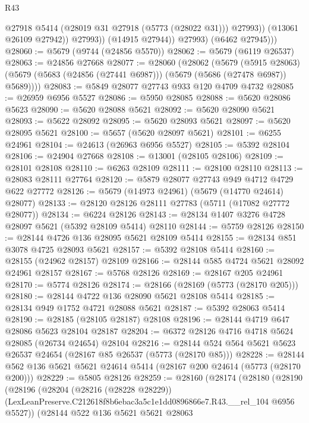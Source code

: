 \begin{lexlean}{R43}
\begin{coremodule}
                      @27918
                      @5414
                      (@28019 @31 @27918 (@5773 (@28022 @31)))
                      @27993))
                  (@13061 @26109 @27942))
                @27993))
            (@14915 @27944))
          @27993)
        (@6462 @27945)))
@28060 := @5679 (@9744 (@24856 @5570))
@28062 := @5679 (@6119 @26537)
@28063 := @24856 @27668
@28077 := @28060
    (@28062
      (@5679
        (@5915 @28063)
        (@5679 (@5683 (@24856 (@27441 @6987))) (@5679 (@5686 (@27478 @6987)) @5689))))
@28083 := @5849 @28077 @27743 @933 @120 @4709 @4732
@28085 := @26959 @6956 @5527
@28086 := @5950 @28085
@28088 := @5620 @28086 @5623
@28090 := @5620 @28088 @5621
@28092 := @5620 @28090 @5621
@28093 := @5622 @28092
@28095 := @5620 @28093 @5621
@28097 := @5620 @28095 @5621
@28100 := @5657 (@5620 @28097 @5621)
@28101 := @6255 @24961
@28104 := @24613 (@26963 @6956 @5527)
@28105 := @5392 @28104
@28106 := @24904 @27668
@28108 := @13001 (@28105 @28106)
@28109 := @28101 @28108
@28110 := @6263 @28109
@28111 := @28100 @28110
@28113 := @28083 @28111 @27764
@28120 := @5879 @28077 @27743 @949 @4712 @4729 @622 @27772
@28126 := @5679 (@14973 @24961) (@5679 (@14770 @24614) @28077)
@28133 := @28120 @28126 @28111 @27783 (@5711 (@17082 @27772 @28077))
@28134 := @6224 @28126
@28143 := @28134 @1407 @3276 @4728 @28097 @5621 (@5392 @28109 @5414) @28110
@28144 := @5759 @28126
@28150 := @28144 @4726 @136 @28095 @5621 @28109 @5414
@28155 := @28134 @851 @3078 @4725 @28093 @5621
@28157 := @5392 @28108 @5414
@28160 := @28155 (@24962 @28157) @28109
@28166 := @28144 @585 @4724 @5621 @28092 @24961 @28157
@28167 := @5768 @28126
@28169 := @28167 @205 @24961
@28170 := @5774 @28126
@28174 := @28166 (@28169 (@5773 (@28170 @205)))
@28180 := @28144 @4722 @136 @28090 @5621 @28108 @5414
@28185 := @28134 @949 @1752 @4721 @28088 @5621
@28187 := @5392 @28063 @5414
@28190 := @28185 (@28105 @28187) @28108
@28196 := @28144 @4719 @647 @28086 @5623 @28104 @28187
@28204 := @6372 @28126 @4716 @4718 @5624 @28085 (@26734 @24654) @28104
@28216 := @28144 @524 @564 @5621 @5623 @26537 @24654 (@28167 @85 @26537 (@5773 (@28170 @85)))
@28228 := @28144 @562 @136 @5621 @5621 @24614 @5414 (@28167 @200 @24614 (@5773 (@28170 @200)))
@28229 := @5805 @28126
@28259 := @28160
    (@28174
      (@28180
        (@28190
          (@28196
            (@28204
              (@28216 (@28228 @28229))
              (LexLeanPreserve.C212618f8b6ebac3a5c1e1dd0896866e7.R43.__rel_104 @6956 @5527))
            (@28144
              @522
              @136
              @5621
              @5621
              @28063

\end{coremodule}
\end{lexlean}
